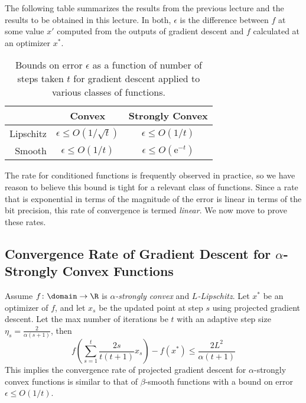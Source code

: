 The following table summarizes the results
from the previous lecture and the results
to be obtained in this lecture.
In both, $\epsilon$ is the difference between
$f$ at some value $x'$ computed
from the outputs of gradient descent and
$f$ calculated at an optimizer $x^*$.

\begin{table}[h]
    \centering
    \begin{tabular}{|r|c|c|}
        \hline
         & Convex & Strongly Convex\\
        \hline
         Lipschitz & $\epsilon \leq O(1/\sqrt{t})$
         & $\epsilon \leq O(1/t)$ \\
         \hline
         Smooth & $\epsilon \leq O(1/t)$
         & $\epsilon \leq O(\mathrm{e}^{-t})$ \\
         \hline
    \end{tabular}
    \caption{Bounds on error $\epsilon$
    as a function of number of steps taken $t$
    for gradient descent applied to various classes of functions.}
    \label{tab:proofs}
\end{table}

The rate for conditioned functions
is frequently observed in practice,
so we have reason to believe this bound is tight
for a relevant class of functions.
Since a rate that is exponential in terms of the
magnitude of the error
is linear in terms of the bit precision,
this rate of convergence is termed \emph{linear}.
We now move to prove these rates.

\subsection{Convergence Rate of Gradient Descent for $\alpha$-Strongly Convex Functions}

\begin{theorem} Assume $f\colon\domain\to\R$ is \emph{$\alpha$-strongly convex} and \emph{$L$-Lipschitz}. Let $x^{*}$ be an optimizer of $f$, and let $x_{s}$ be the updated point at step $s$ using projected gradient descent. Let the max number of iterations be $t$ with an adaptive step size $\eta_{s} = \frac{2}{\alpha(s+1)}$, then
\[
f\left(\sum_{s=1}^{t}\frac{2s}{t(t+1)}x_{s}\right) - f(x^{*})\leq\frac{2 L^{2}}{\alpha(t+1)}
\]
This implies the convergence rate of projected gradient descent for $\alpha$-strongly convex functions is similar to that of $\beta$-smooth functions with a bound on error $\epsilon \leq O(1/t)$.
\end{theorem}


